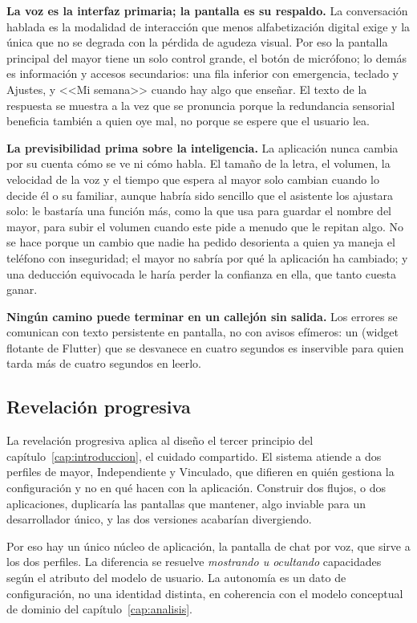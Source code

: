 \textbf{La voz es la interfaz primaria; la pantalla es su respaldo.} La conversación hablada es la modalidad de interacción que menos alfabetización digital exige y la única que no se degrada con la pérdida de agudeza visual. Por eso la pantalla principal del mayor tiene un solo control grande, el botón de micrófono; lo demás es información y accesos secundarios: una fila inferior con emergencia, teclado y Ajustes, y <<Mi semana>> cuando hay algo que enseñar. El texto de la respuesta se muestra a la vez que se pronuncia porque la redundancia sensorial beneficia también a quien oye mal, no porque se espere que el usuario lea.

\textbf{La previsibilidad prima sobre la inteligencia.} La aplicación nunca cambia por su cuenta cómo se ve ni cómo habla. El tamaño de la letra, el volumen, la velocidad de la voz y el tiempo que espera al mayor solo cambian cuando lo decide él o su familiar, aunque habría sido sencillo que el asistente los ajustara solo: le bastaría una función más, como la que usa para guardar el nombre del mayor, para subir el volumen cuando este pide a menudo que le repitan algo. No se hace porque un cambio que nadie ha pedido desorienta a quien ya maneja el teléfono con inseguridad; el mayor no sabría por qué la aplicación ha cambiado; y una deducción equivocada le haría perder la confianza en ella, que tanto cuesta ganar.

\textbf{Ningún camino puede terminar en un callejón sin salida.} Los errores se comunican con texto persistente en pantalla, no con avisos efímeros: un  (widget flotante de Flutter) que se desvanece en cuatro segundos es inservible para quien tarda más de cuatro segundos en leerlo.

\subsection{Revelación progresiva}

La revelación progresiva aplica al diseño el tercer principio del capítulo~\ref{cap:introduccion}, el cuidado compartido. El sistema atiende a dos perfiles de mayor, Independiente y Vinculado, que difieren en quién gestiona la configuración y no en qué hacen con la aplicación. Construir dos flujos, o dos aplicaciones, duplicaría las pantallas que mantener, algo inviable para un desarrollador único, y las dos versiones acabarían divergiendo.

Por eso hay un único núcleo de aplicación, la pantalla de chat por voz, que sirve a los dos perfiles. La diferencia se resuelve \emph{mostrando u ocultando} capacidades según el atributo  del modelo de usuario. La autonomía es un dato de configuración, no una identidad distinta, en coherencia con el modelo conceptual de dominio del capítulo~\ref{cap:analisis}.

